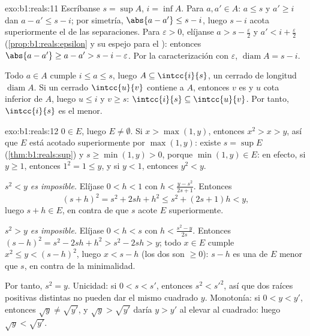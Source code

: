 \begin{solution}{exo:b1:reals:11}
Escríbanse $s = \sup A$, $i = \inf A$. Para $a, a' \in A$: $a \leq s$
y $a' \geq i$ dan $a - a' \leq s - i$; por simetría,
$\abs{a - a'} \leq s - i$, luego $s - i$ acota superiormente el
 de las separaciones. Para $\varepsilon > 0$, elíjanse
$a > s - \frac\varepsilon2$ y $a' < i + \frac\varepsilon2$
(\cref{prop:b1:reals:epsilon} y su espejo para el ): entonces
$\abs{a - a'} \geq a - a' > s - i - \varepsilon$. Por la
caracterización con $\varepsilon$, $\operatorname{diam} A = s - i$.

Todo $a \in A$ cumple $i \leq a \leq s$, luego $A \subseteq
\intcc{i}{s}$, un  cerrado de longitud
$\operatorname{diam} A$. Si un  cerrado $\intcc{u}{v}$
contiene a $A$, entonces $v$ es  y $u$ cota inferior de
$A$, luego $u \leq i$ y $v \geq s$: $\intcc{i}{s} \subseteq
\intcc{u}{v}$. Por tanto, $\intcc{i}{s}$ es el menor.
\end{solution}

\begin{solution}{exo:b1:reals:12}
$0 \in E$, luego $E \neq \emptyset$. Si $x > \max(1, y)$, entonces
$x^2 > x > y$, así que $E$ está acotado superiormente por
$\max(1, y)$: existe $s = \sup E$ (\cref{thm:b1:reals:sup}) y
$s \geq \min(1, y) > 0$, porque $\min(1, y) \in E$: en efecto, si
$y \geq 1$, entonces $1^2 = 1 \leq y$, y si $y < 1$, entonces
$y^2 < y$.

\emph{$s^2 < y$ es imposible.} Elíjase $0 < h < 1$ con
$h < \frac{y - s^2}{2s + 1}$. Entonces
\[
(s + h)^2 = s^2 + 2sh + h^2 \leq s^2 + (2s + 1)h < y ,
\]
luego $s + h \in E$, en contra de que $s$ acote $E$ superiormente.

\emph{$s^2 > y$ es imposible.} Elíjase $0 < h < s$ con
$h < \frac{s^2 - y}{2s}$. Entonces $(s - h)^2 = s^2 - 2sh + h^2 >
s^2 - 2sh > y$; todo $x \in E$ cumple $x^2 \leq y < (s - h)^2$, luego
$x < s - h$ (los dos son $\geq 0$): $s - h$ es una  de
$E$ menor que $s$, en contra de la minimalidad.

Por tanto, $s^2 = y$. Unicidad: si $0 < s < s'$, entonces
$s^2 < s'^2$, así que dos raíces positivas distintas no pueden dar el
mismo cuadrado $y$. Monotonía: si $0 < y < y'$, entonces
$\sqrt y \neq \sqrt{y'}$, y $\sqrt y > \sqrt{y'}$ daría $y > y'$ al
elevar al cuadrado: luego $\sqrt y < \sqrt{y'}$.
\end{solution}

